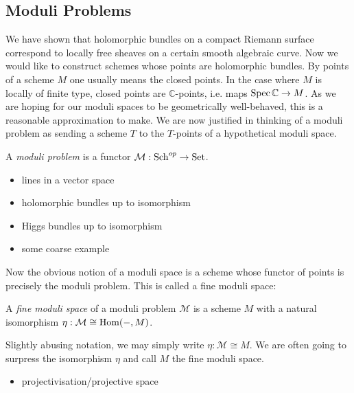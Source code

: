 \documentclass[12pt]{ociamthesis}  %
\begin{document}
\missingsection

\subsection{Moduli Problems}

We have shown that holomorphic bundles on a compact Riemann surface
correspond to locally free sheaves on a certain smooth algebraic
curve. Now we would like to construct schemes whose points are
holomorphic bundles. By points of a scheme $M$ one usually means the
closed points. In the case where $M$ is locally of finite type,
closed points are $\mathbb{C}$-points, i.e. maps
$\operatorname{Spec}\mathbb{C}\to M$. \cite[Corollary 3.36]{gortz2010} As we
are hoping for our moduli spaces to be geometrically well-behaved,
this is a reasonable approximation to make. We are now justified in
thinking of a moduli problem as sending a scheme $T$ to the
$T$-points of a hypothetical moduli space.

\begin{definition}
  A \emph{moduli problem} is a functor $\mathcal M:\operatorname{Sch}^{op}\to\operatorname{Set}$.
\end{definition}

\begin{example}
  \missingexample
  \begin{itemize}
    \item lines in a vector space
    \item holomorphic bundles up to isomorphism
    \item Higgs bundles up to isomorphism
    \item some coarse example
  \end{itemize}
\end{example}

Now the obvious notion of a moduli space is a scheme whose functor
of points is precisely the moduli problem. This is called a fine
moduli space:

\begin{definition}
  A \emph{fine moduli space} of a moduli problem $\mathcal M$
  is a scheme $M$ with a natural isomorphism
  $\eta : \mathcal M \cong \operatorname{Hom}(-,M)$.
\end{definition}

Slightly abusing notation, we may simply write
$\eta : \mathcal M \cong M$. We are often going to surpress the
isomorphism $\eta$ and call $M$ the fine moduli space.

\begin{example}
  \begin{itemize}
    \item projectivisation/projective space
  \end{itemize}
\end{example}
\end{document}

